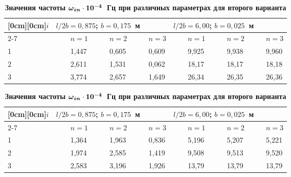\begin{table}[h!]
\centering

\begin{minipage}[t]{.92\textwidth}

\renewcommand{\bfdefault}{b}
\caption{\small\bfseries Значения частоты $\boldsymbol\omega _{\boldsymbol{in}}\bf \cdot 10^{ - 4}$~Гц при различных параметрах 
для первого варианта}
\vspace{-3mm}
\begin{tabular}
{p{10pt}|p{56pt}|p{54pt}|p{62pt}|p{63pt}|p{63pt}|p{63pt}}
\hline
\raisebox{-1.50ex}[0cm][0cm]{\centering $i$}& 
\multicolumn{3}{|p{173pt}|}{\centering $l/2b = 0{,}875$; $b = 0{,}175$~м} & 
\multicolumn{3}{|p{189pt}}{\centering $l/2b = 6{,}00$; $b = 0{,}025$~м}  \\
\cline{2-7} 
 & 
~~~~$n=1$& 
~~~~$n=2$& 
~~~~$n=3$& 
~~~~$n=1$& 
~~~~$n=2$& 
~~~~$n=3$ \\
\hline
1& 
~~~~1,447& 
~~~~0,605& 
~~~~0,609& 
~~~~9,925& 
~~~~9,938& 
~~~~9,960 \\
2& 
~~~~2,611& 
~~~~1,531& 
~~~~0,062& 
~~~~18,17& 
~~~~18,17& 
~~~~18,18 \\
3& 
~~~~3,774& 
~~~~2,657& 
~~~~1,649& 
~~~~26,34& 
~~~~26,35& 
~~~~26,36 \\
\hline
\end{tabular}

\vspace{5mm}

\centering

\caption{\small\bfseries Значения частоты $\boldsymbol\omega _{\boldsymbol{in}}\bf \cdot 10^{ - 4}$~Гц при различных параметрах 
для второго варианта }
\vspace{-3mm}
\begin{tabular}
{p{10pt}|p{56pt}|p{54pt}|p{62pt}|p{63pt}|p{63pt}|p{63pt}}
\hline
\raisebox{-1.50ex}[0cm][0cm]{\centering $i$}& 
\multicolumn{3}{|p{173pt}|}{\centering $l/2b = 0{,}875$; $b = 0{,}175$~м} & 
\multicolumn{3}{|p{189pt}}{\centering $l/2b = 6{,}00$; $b = 0{,}025$~м}  \\
\cline{2-7} 
 & 
~~~~$n=1$& 
~~~~$n =2$& 
~~~~$n =3$& 
~~~~$n =1$& 
~~~~$n =2$& 
~~~~$n =3$ \\
\hline
1& 
~~~~1,364& 
~~~~1,963& 
~~~~0,836& 
~~~~5,196& 
~~~~5,207& 
~~~~5,221 \\
2& 
~~~~1,974& 
~~~~2,585& 
~~~~1,419& 
~~~~9,508& 
~~~~9,513& 
~~~~9,520 \\
3& 
~~~~2,583& 
~~~~3,196& 
~~~~1,926& 
~~~~13,79& 
~~~~13,79& 
~~~~13,79 \\
\hline
\end{tabular}
\renewcommand{\bfdefault}{bx}


\end{minipage}
\end{table}



